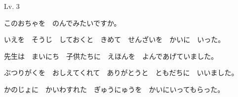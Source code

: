 	\begin{mondai}{Lv. 3}
		\item このおちゃを　のんでみたいですか。
		\item いえを　そうじ　しておくと　きめて　せんざいを　かいに　いった。
		\item 先生は　まいにち　子供たちに　えほんを　よんであげていました。
		\item ぶつりがくを　おしえてくれて　ありがとうと　ともだちに　いいました。
		\item *かのじょに　かいわすれた　ぎゅうにゅうを　かいにいってもらった。
	\end{mondai}

